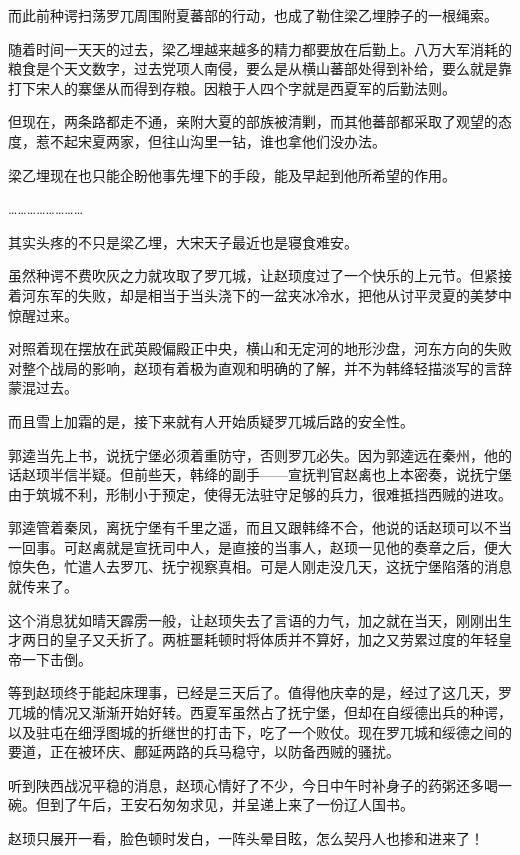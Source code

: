 而此前种谔扫荡罗兀周围附夏蕃部的行动，也成了勒住梁乙埋脖子的一根绳索。

随着时间一天天的过去，梁乙埋越来越多的精力都要放在后勤上。八万大军消耗的粮食是个天文数字，过去党项人南侵，要么是从横山蕃部处得到补给，要么就是靠打下宋人的寨堡从而得到存粮。因粮于人四个字就是西夏军的后勤法则。

但现在，两条路都走不通，亲附大夏的部族被清剿，而其他蕃部都采取了观望的态度，惹不起宋夏两家，但往山沟里一钻，谁也拿他们没办法。

梁乙埋现在也只能企盼他事先埋下的手段，能及早起到他所希望的作用。

……………………

其实头疼的不只是梁乙埋，大宋天子最近也是寝食难安。

虽然种谔不费吹灰之力就攻取了罗兀城，让赵顼度过了一个快乐的上元节。但紧接着河东军的失败，却是相当于当头浇下的一盆夹冰冷水，把他从讨平灵夏的美梦中惊醒过来。

对照着现在摆放在武英殿偏殿正中央，横山和无定河的地形沙盘，河东方向的失败对整个战局的影响，赵顼有着极为直观和明确的了解，并不为韩绛轻描淡写的言辞蒙混过去。

而且雪上加霜的是，接下来就有人开始质疑罗兀城后路的安全性。

郭逵当先上书，说抚宁堡必须着重防守，否则罗兀必失。因为郭逵远在秦州，他的话赵顼半信半疑。但前些天，韩绛的副手——宣抚判官赵禼也上本密奏，说抚宁堡由于筑城不利，形制小于预定，使得无法驻守足够的兵力，很难抵挡西贼的进攻。

郭逵管着秦凤，离抚宁堡有千里之遥，而且又跟韩绛不合，他说的话赵顼可以不当一回事。可赵禼就是宣抚司中人，是直接的当事人，赵顼一见他的奏章之后，便大惊失色，忙遣人去罗兀、抚宁视察真相。可是人刚走没几天，这抚宁堡陷落的消息就传来了。

这个消息犹如晴天霹雳一般，让赵顼失去了言语的力气，加之就在当天，刚刚出生才两日的皇子又夭折了。两桩噩耗顿时将体质并不算好，加之又劳累过度的年轻皇帝一下击倒。

等到赵顼终于能起床理事，已经是三天后了。值得他庆幸的是，经过了这几天，罗兀城的情况又渐渐开始好转。西夏军虽然占了抚宁堡，但却在自绥德出兵的种谔，以及驻屯在细浮图城的折继世的打击下，吃了一个败仗。现在罗兀城和绥德之间的要道，正在被环庆、鄜延两路的兵马稳守，以防备西贼的骚扰。

听到陕西战况平稳的消息，赵顼心情好了不少，今日中午时补身子的药粥还多喝一碗。但到了午后，王安石匆匆求见，并呈递上来了一份辽人国书。

赵顼只展开一看，脸色顿时发白，一阵头晕目眩，怎么契丹人也掺和进来了！

